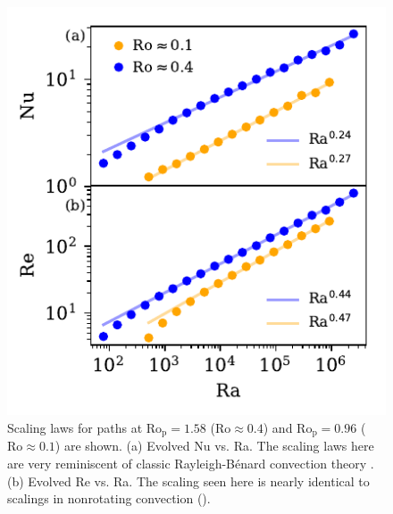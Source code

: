 \documentclass[twocolumn, amsmath, amsfonts, amssymb]{aastex62}
\newcommand{\RB}{Rayleigh-B\'{e}nard }
\newcommand{\pro}{\ensuremath{\text{Ro}_{\text{p}}}}
\begin{document}
\begin{figure}[t!]
    \includegraphics{nu_and_re.pdf}
    \caption{Scaling laws for paths at $\pro = 1.58$ ($\text{Ro} \approx 0.4$) and
    $\pro = 0.96$ ($\text{Ro} \approx 0.1$) are shown. 
    (a) Evolved Nu vs. Ra. The scaling laws here are very reminiscent of classic \RB convection
    theory \citep{ahlers&all2009}.
    (b) Evolved Re vs. Ra.
    The scaling seen here is nearly identical to scalings in nonrotating convection (\AB).
    \label{fig:nu_and_re} }
\end{figure}
\end{document}
